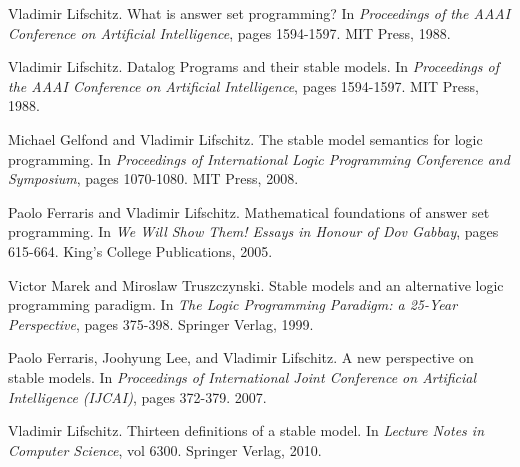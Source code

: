 \documentclass[11pt]{article}
\begin{document}
\begin{thebibliography}{9}
  Vladimir Lifschitz. 
  What is answer set programming? 
  In \textit{Proceedings of the AAAI Conference on Artificial Intelligence}, pages 1594-1597. 
  MIT Press, 1988.

  Vladimir Lifschitz. 
  Datalog Programs and their stable models.
  In \textit{Proceedings of the AAAI Conference on Artificial Intelligence}, pages 1594-1597. 
  MIT Press, 1988.

  Michael Gelfond and Vladimir Lifschitz. 
  The stable model semantics for logic programming.  
  In \textit{Proceedings of International Logic Programming Conference and Symposium}, pages 1070-1080. 
  MIT Press, 2008.

  Paolo Ferraris and Vladimir Lifschitz. 
  Mathematical foundations of answer set programming.  
  In \textit{We Will Show Them! Essays in Honour of Dov Gabbay}, pages 615-664. 
  King's College Publications, 2005.

  Victor Marek and Miroslaw Truszczynski. 
  Stable models and an alternative logic programming paradigm.  
  In \textit{The Logic Programming Paradigm: a 25-Year Perspective}, pages 375-398. 
  Springer Verlag, 1999.

  Paolo Ferraris, Joohyung Lee, and Vladimir Lifschitz. 
  A new perspective on stable models.  
  In \textit{Proceedings of International Joint Conference on Artificial Intelligence (IJCAI)}, pages 372-379. 
  2007.

  Vladimir Lifschitz. 
  Thirteen definitions of a stable model.  
  In \textit{Lecture Notes in Computer Science}, vol 6300. 
  Springer Verlag, 2010.
\end{thebibliography}
\end{document}
